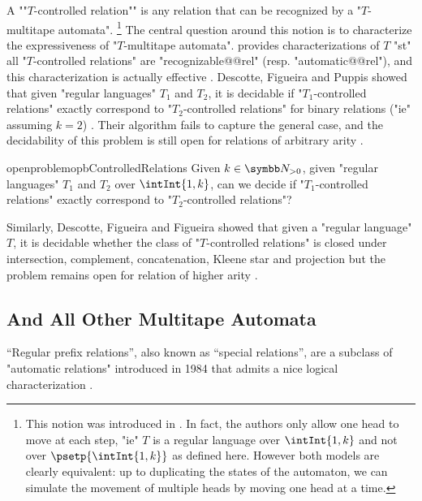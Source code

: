 A \AP""$T$-controlled relation"" is any relation that can be recognized by
a "$T$-multitape automata".%
\footnote{This notion was introduced in \cite[\S~3]{FigueiraLibkin2015SynchronizingRelations}.
In fact, the authors only allow one head to move at each step, "ie" $T$ is a regular language
over $\intInt{1,k}$ and not over $\psetp{\intInt{1,k}}$ as defined here. However both
models are clearly equivalent: up to duplicating the states of the automaton, we can simulate
the movement of multiple heads by moving one head at a time.}
The central question around this notion is to characterize the
expressiveness of "$T$-multitape automata".
\cite[Theorem~1]{FigueiraLibkin2015SynchronizingRelations} provides characterizations 
of $T$ "st" all "$T$-controlled relations" are "recognizable@@rel" (resp. "automatic@@rel"),
and this characterization is actually effective
\cite[Corollary~3]{FigueiraLibkin2015SynchronizingRelations}.
Descotte, Figueira and Puppis showed
that given "regular languages" $T_1$ and $T_2$, it is decidable
if "$T_1$-controlled relations" exactly correspond to "$T_2$-controlled relations"
for binary relations ("ie" assuming $k=2$)
\cite[Main Theorem]{DescotteFigueiraPuppis2018ResynchronizingClasses}.
Their algorithm fails to capture the general case, and the decidability of this problem
is still open for relations of arbitrary arity
\cite[\S~9]{DescotteFigueiraPuppis2018ResynchronizingClasses}.
\begin{restatable}{openproblem}{opbControlledRelations}
	\label{opb:controlled-relations}
	Given $k\in\Np$, given "regular languages" $T_1$ and $T_2$ over $\intInt{1,k}$,
	can we decide if "$T_1$-controlled relations" exactly correspond to
	"$T_2$-controlled relations"?
\end{restatable}
Similarly, Descotte, Figueira and Figueira showed that given a "regular language"
$T$, it is decidable whether the class of "$T$-controlled relations"
is closed under intersection, complement, concatenation, Kleene star 
and projection
\cite[Theorem, p.~2]{DescotteFigueiraFigueira2020Containment19ClosurePropertiesSynchronizedRelations}
but the problem remains open for relation of higher arity
\cite[\S~6]{DescotteFigueiraFigueira2020Containment19ClosurePropertiesSynchronizedRelations}.


\subsection{And All Other Multitape Automata}

``Regular prefix relations'', also known as ``special relations'', are a subclass of "automatic relations" introduced in 1984 that admits a nice logical characterization
\cite[\S~``1984'']{Choffrut2006Survey}.

